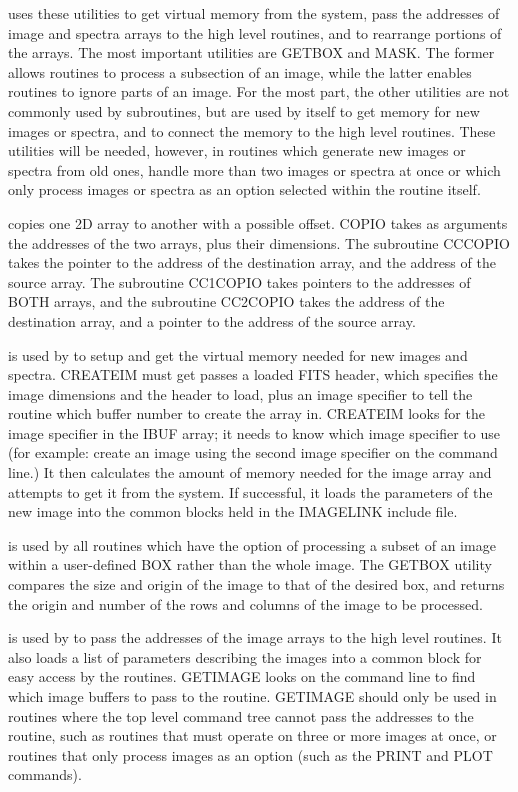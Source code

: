 \vskip 0.125in
	\V uses these utilities to get virtual memory from the system,
pass the addresses of image and spectra arrays to the high level
routines, and to rearrange portions of the arrays. The most important
utilities are GETBOX and MASK.  The former allows routines to process
a subsection of an image, while the latter enables routines to ignore
parts of an image. For the most part, the other utilities are not
commonly used by subroutines, but are used by \V itself to get memory
for new images or spectra, and to connect the memory to the high level
routines. These utilities will be needed, however, in routines which
generate new images or spectra from old ones, handle more than two
images or spectra at once or which only process images or spectra as
an option selected within the routine itself. 

\hhang
{}copies one 2D array to another with
a possible offset.  COPIO takes as arguments the addresses of the
two arrays, plus their dimensions. The subroutine CCCOPIO takes the
pointer to the address of the destination array, and the address of the
source array. The subroutine CC1COPIO takes pointers to the addresses of
BOTH arrays, and the subroutine CC2COPIO takes the address of the destination
array, and a pointer to the address of the source array.

\hhang 
{}is used by \V to setup and
get the virtual memory needed for new images and spectra. CREATEIM must
get passes a loaded FITS header, which specifies the image dimensions and
the header to load, plus an image specifier to tell the routine which
buffer number to create the array in.
CREATEIM looks for the image specifier in the IBUF array;  it needs to
know which image specifier to use (for example:  create an image using
the second image specifier on the command line.) It then calculates
the amount of memory needed for the image array and attempts to get it
from the system. If successful, it loads the parameters of the new
image into the common blocks held in the IMAGELINK include file. 

\hhang
{}is used by all routines which
have the option of processing a subset of an image within a
user-defined BOX rather than the whole image.  The GETBOX utility
compares the size and origin of the image to that of the desired
box, and returns the origin and number of the rows and columns of
the image to be processed. 

\hhang
{}is used by \V to pass the
addresses of the image arrays to the high level routines. It also
loads a list of parameters describing the images into a common
block for easy access by the routines. GETIMAGE looks on the
command line to find which image buffers to pass to the routine.
GETIMAGE should only be used in routines where the top level command
tree cannot pass
the addresses to the routine, such as routines that must operate
on three or more images at once, or routines that only process
images as an option (such as the PRINT and PLOT commands). 

